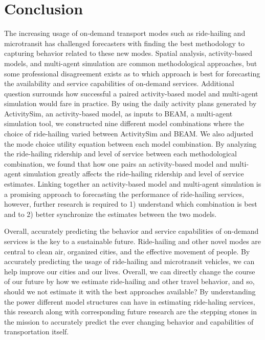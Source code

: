 \documentclass[fancy, masters]{byuthesis}
\begin{document}
\hypertarget{conclusion}{%
\section{Conclusion}\label{conclusion}}

The increasing usage of on-demand transport modes such as ride-hailing and microtransit has challenged forecasters with finding the best methodology to capturing behavior related to these new modes. Spatial analysis, activity-based models, and multi-agent simulation are common methodological approaches, but some professional disagreement exists as to which approach is best for forecasting the availability and service capabilities of on-demand services. Additional question surrounds how successful a paired activity-based model and multi-agent simulation would fare in practice. By using the daily activity plans generated by ActivitySim, an activity-based model, as inputs to BEAM, a multi-agent simulation tool, we constructed nine different model combinations where the choice of ride-hailing varied between ActivitySim and BEAM. We also adjusted the mode choice utility equation between each model combination. By analyzing the ride-hailing ridership and level of service between each methodological combination, we found that how one pairs an activity-based model and multi-agent simulation greatly affects the ride-hailing ridership and level of service estimates. Linking together an activity-based model and multi-agent simulation is a promising approach to forecasting the performance of ride-hailing services, however, further research is required to 1) understand which combination is best and to 2) better synchronize the estimates between the two models.

Overall, accurately predicting the behavior and service capabilities of on-demand services is the key to a sustainable future. Ride-hailing and other novel modes are central to clean air, organized cities, and the effective movement of people. By accurately predicting the usage of ride-hailing and microtransit vehicles, we can help improve our cities and our lives. Overall, we can directly change the course of our future by how we estimate ride-hailing and other travel behavior, and so, should we not estimate it with the best approaches available? By understanding the power different model structures can have in estimating ride-haling services, this research along with corresponding future research are the stepping stones in the mission to accurately predict the ever changing behavior and capabilities of transportation itself.
\end{document}
